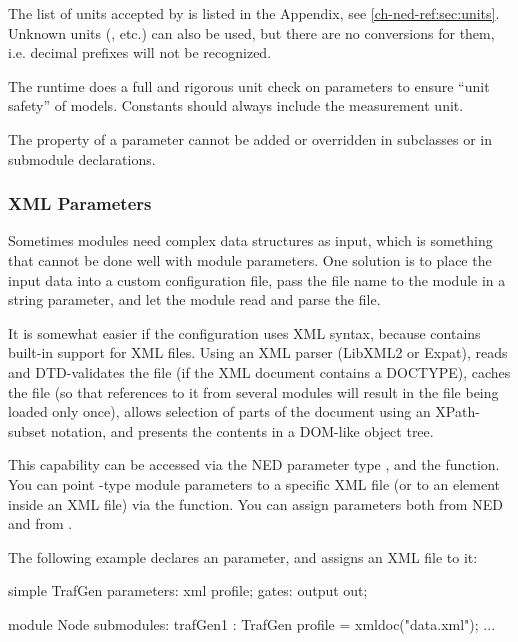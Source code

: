 \begin{note}
    The list of units accepted by {\opp} is listed in the Appendix, see
    \ref{ch-ned-ref:sec:units}. Unknown units (, etc.)
    can also be used, but there are no conversions for them,
    i.e. decimal prefixes will not be recognized.
\end{note}

The {\opp} runtime does a full and rigorous unit check on
parameters to ensure ``unit safety'' of models. Constants should
always include the measurement unit.

The  property of a parameter cannot be added or overridden
in subclasses or in submodule declarations.


\subsubsection{XML Parameters}

Sometimes modules need complex data structures as input, which is something
that cannot be done well with module parameters. One solution is to place
the input data into a custom configuration file, pass the file name to the
module in a string parameter, and let the module read and parse the file.

It is somewhat easier if the configuration uses XML syntax, because {\opp}
contains built-in support for XML files. Using an XML parser (LibXML2 or
Expat), {\opp} reads and DTD-validates the file (if the XML document
contains a DOCTYPE), caches the file (so that references to it from several
modules will result in the file being loaded only once), allows selection
of parts of the document using an XPath-subset notation, and presents the
contents in a DOM-like object tree.

This capability can be accessed via the NED parameter type ,
and the  function. You can point -type
module parameters to a specific XML file (or to an element inside an XML
file) via the  function. You can assign 
parameters both from NED and from .

The following example declares an  parameter, and assigns an
XML file to it:

\begin{ned}
simple TrafGen {
    parameters:
        xml profile;
    gates:
        output out;
}

module Node {
    submodules:
        trafGen1 : TrafGen {
            profile = xmldoc("data.xml");
        }
        ...
}
\end{ned}

